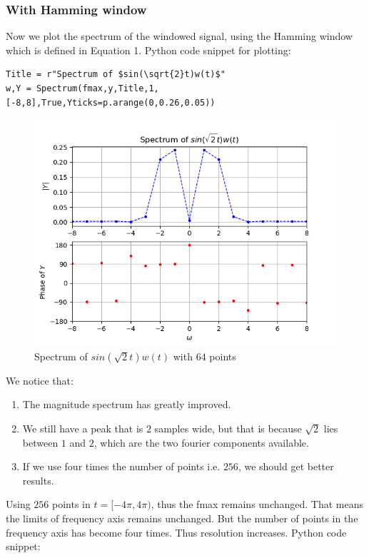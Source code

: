 \documentclass[11pt, a4paper]{article}
\begin{document}
        \subsubsection{With Hamming window}
        Now we plot the spectrum of the windowed signal, using the Hamming window which is defined in Equation 1. Python code snippet for plotting:
            \begin{verbatim}
Title = r"Spectrum of $sin(\sqrt{2}t)w(t)$"
w,Y = Spectrum(fmax,y,Title,1,[-8,8],True,Yticks=p.arange(0,0.26,0.05))
            \end{verbatim}
            \begin{figure}[!h]
                \centering
                \includegraphics[scale = 0.65]{Figure 1.png}
                \caption{Spectrum of $sin(\sqrt{2}t)w(t)$ with $64$ points}
                \label{fig:Figure 1}
            \end{figure}
        We notice that:
            \begin{enumerate}
            \item The magnitude spectrum has greatly improved.
            \item We still have a peak that is $2$ samples wide, but that is because $\sqrt{2}$ lies between $1$ and $2$, which are the two fourier components available.
            \item If we use four times the number of points i.e. $256$, we should get better results.
            \end{enumerate}
        Using $256$ points in $t = [-4\pi,4\pi)$, thus the fmax remains unchanged. That means the limits of frequency axis remains unchanged. But the number of points in the frequency axis has become four times. Thus resolution increases. Python code snippet:
\end{document}
